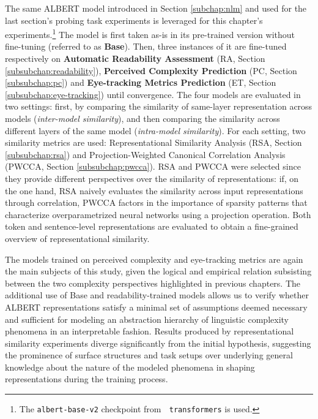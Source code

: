 \documentclass[a4paper, nobind]{templates/ociamthesis}
\begin{document}
The same ALBERT \autocite{lan-etal-2020-albert} model introduced in Section \ref{subchap:nlm} and used for the last section's probing task experiments is leveraged for this chapter's experiments.\footnote{The \texttt{albert-base-v2} checkpoint from 🤗 \texttt{transformers} \autocite{wolf-etal-2020-huggingface} is used.} The model is first taken as-is in its pre-trained version without fine-tuning (referred to as \textbf{Base}). Then, three instances of it are fine-tuned respectively on \textbf{Automatic Readability Assessment} (RA, Section \ref{subsubchap:readability}), \textbf{Perceived Complexity Prediction} (PC, Section \ref{subsubchap:pc}) and \textbf{Eye-tracking Metrics Prediction} (ET, Section \ref{subsubchap:eye-tracking}) until convergence. The four models are evaluated in two settings: first, by comparing the similarity of same-layer representation across models (\emph{inter-model similarity}), and then comparing the similarity across different layers of the same model (\emph{intra-model similarity}). For each setting, two similarity metrics are used: Representational Similarity Analysis (RSA, Section \ref{subsubchap:rsa}) and Projection-Weighted Canonical Correlation Analysis (PWCCA, Section \ref{subsubchap:pwcca}). RSA and PWCCA were selected since they provide different perspectives over the similarity of representations: if, on the one hand, RSA naively evaluates the similarity across input representations through correlation, PWCCA factors in the importance of sparsity patterns that characterize overparametrized neural networks using a projection operation. Both token and sentence-level representations are evaluated to obtain a fine-grained overview of representational similarity.

The models trained on perceived complexity and eye-tracking metrics are again the main subjects of this study, given the logical and empirical relation subsisting between the two complexity perspectives highlighted in previous chapters. The additional use of Base and readability-trained models allows us to verify whether ALBERT representations satisfy a minimal set of assumptions deemed necessary and sufficient for modeling an abstraction hierarchy of linguistic complexity phenomena in an interpretable fashion. Results produced by representational similarity experiments diverge significantly from the initial hypothesis, suggesting the prominence of surface structures and task setups over underlying general knowledge about the nature of the modeled phenomena in shaping representations during the training process.
\end{document}
